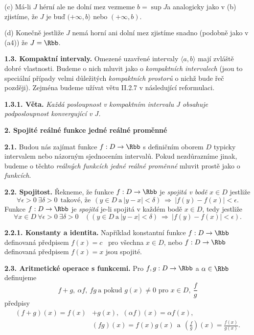 \documentclass[12pt]{article}
\begin{document}
{ \smallskip
 
 (c) Má-li $J$ hérní ale ne dolní mez vezmeme  $b=\sup J$a analogicky jako v (b) zjistíme, že $J$ je buď $(+\infty,b \rangle$ nebo $(+\infty,b)$.
 
 \smallskip
 
 (d) Konečně jestliže $J$ nemá horní ani dolní mez zjistíme snadno (podobně jako v (a4)) že $J=\Rbb$. \sq
 
\bigskip

{\bf 1.3. Kompaktní intervaly.} Omezené uzavřené intervaly $\langle a,b\rangle$
mají zvláště dobré vlastnosti. Budeme o nich mluvit jako o {\em kompaktních intervalech} (jsou to speciální případy velmi důležitých {\em kompaktních prostorů} o nichž bude řeč později). Zejména budeme  užívat větu II.2.7 v následující reformulaci.

\medskip

{\bf 1.3.1. Věta.} {\em Každá posloupnost v kompaktním intervalu  $J$ obsahuje podposloupnost konvergující v $J$.}

\vskip10mm
 
 {\large\bf 2. Spojité reálné funkce jedné reálné proměnné}
 
 \bigskip
 
 {\bf 2.1.} Budou nás zajímat funkce $f:D\to\Rbb$ s definičním oborem $D$ typicky intervalem nebo názorným sjednocením intervalů. Pokud nezdůrazníme jinak, budeme o těchto {\em reálných funkcích jedné reálné proměnné} mluvit prostě
 jako o  {\em funkcích}.
 
 \bigskip
 
 {\bf 2.2. Spojitost.} Řekneme, že funkce $f:D\to\Rbb$ je  {\em spojitá v bodě} $x\in D$ jestliže
 $$
 \forall \epsilon>0\ \exists \delta>0\ \ \text{takové, že}\ \ (y\in D \ \text{a}\ |y-x|<\delta)\ \Rightarrow\ |f(y)-f(x)|<\epsilon.
 $$ 
Funkce $f:D\to\Rbb$ je {\em spojitá} je-li spojitá v každém bodě $x\in D$, tedy jestliže
 $$
 \forall x\in D\  \forall \epsilon>0 \ \exists \delta>0\ \ \ \ ((y\in D \ \text{a}\ |y-x|<\delta)\ \Rightarrow\ |f(y)-f(x)|<\epsilon).
 $$ 
 
 \medskip 
 
 {\bf 2.2.1. Konstanty a identita.} Například konstantní funkce $f:D\to\Rbb$ definovaná předpisem
 $f(x)=c$ \ pro všechna $x\in D$, nebo $f:D\to\Rbb$ definovaná předpisem $f(x)=x$ jsou spojité.
 
 \bigskip
 
 {\bf 2.3. Aritmetické operace s funkcemi.} Pro $f,g:D\to\Rbb$ a $\alpha\in \Rbb$ definujeme
 $$
 f+g,\ \alpha f,\ fg\ \text{a pokud $g(x)\neq 0$ pro $x\in D$}, \ \frac{f}{g}
 $$
 předpisy
 $$
 \begin{aligned}
 (f+g)(x)=f(x)&+g(x),\ \ (\alpha f)(x)=\alpha f(x),\\ 
 &(fg)(x)=f(x)g(x)\ \ \text{a} \ \ \left(\frac{f}{g}\right)(x)= \frac{f(x)}{g(x)}.
 \end{aligned}
 $$
 
}
\end{document}
